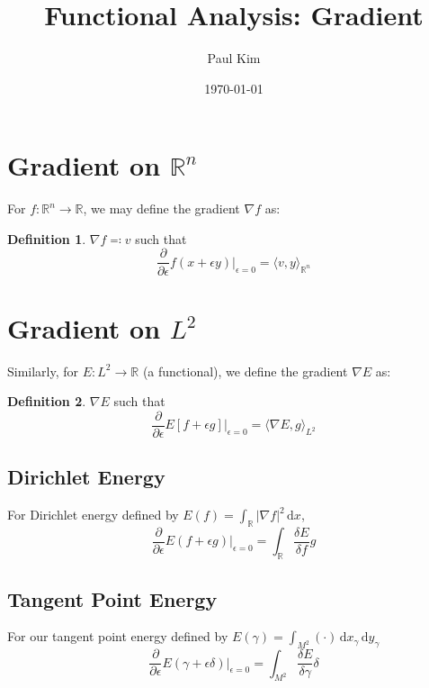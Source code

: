 \documentclass[a4paper]{article}
\title{Functional Analysis: Gradient}
\author{Paul Kim}
\date{\today}
\theoremstyle{definition}
\newtheorem{definition}{Definition}
\newcommand{\inner}[2]{\langle #1, #2 \rangle}
\newcommand{\dx}{\, \text{d} x}
\newcommand{\dy}{\, \text{d} y}
\begin{document}
\maketitle

\section{Gradient on $\mathbb{R}^n$}
For $f:\mathbb{R}^n \rightarrow \mathbb{R}$, we may define the gradient $\nabla f$ as:
\begin{definition}
    $\nabla f \eqqcolon v$ such that
    \begin{equation}
        \frac{\partial}{\partial \epsilon} f\left( x + \epsilon y \right) |_{\epsilon = 0} = \inner{v}{y}_{\mathbb{R}^n}
    \end{equation}
\end{definition}

\section{Gradient on $L^2$}
Similarly, for $E: L^2 \rightarrow \mathbb{R}$ (a functional), we define the gradient $\nabla E$ as:
\begin{definition}
    $\nabla E$ such that
    \begin{equation}
        \frac{\partial}{\partial \epsilon} E\left[ f + \epsilon g \right] | _{\epsilon = 0} = \inner{\nabla E}{g}_{L^2}
    \end{equation}
\end{definition}

\subsection{Dirichlet Energy}
For Dirichlet energy defined by $E(f) = \int_{\mathbb{R}} |\nabla f|^2 \dx$,
\begin{equation}
    \frac{\partial}{\partial \epsilon} E\left( f + \epsilon g \right) |_{\epsilon = 0} = \int_{\mathbb{R}} \frac{\delta E}{\delta f} g
\end{equation}

\subsection{Tangent Point Energy}
For our tangent point energy defined by $E(\gamma) = \int_{M^2} \left( \cdot \right) \dx_{\gamma} \dy_{\gamma}$
\begin{equation}
    \frac{\partial}{\partial \epsilon} E(\gamma + \epsilon \delta) |_{\epsilon = 0} = \int_{M^2} \frac{\delta E}{\delta \gamma} \delta
\end{equation}
\end{document}
